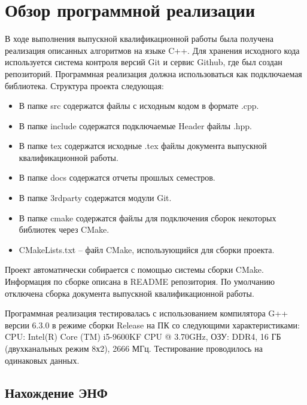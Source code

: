 \newpage

\section{Обзор программной реализации}

В ходе выполнения выпускной квалификационной работы была получена реализация описанных алгоритмов на языке C++. Для хранения исходного кода используется система контроля версий Git и сервис Github, где был создан репозиторий. Программная реализация должна использоваться как подключаемая библиотека. Структура проекта следующая:
\begin{itemize}

\item В папке src содержатся файлы с исходным кодом в формате .cpp.

\item В папке include содержатся подключаемые Header файлы .hpp.

\item В папке tex содержатся исходные .tex файлы документа выпускной квалификационной работы.

\item В папке docs содержатся отчеты прошлых семестров.

\item В папке 3rdparty содержатся модули Git.

\item В папке cmake содержатся файлы для подключения сборок некоторых библиотек через CMake.

\item CMakeLists.txt -- файл CMake, использующийся для сборки проекта.

\end{itemize}

Проект автоматически собирается с помощью системы сборки CMake. Информация по сборке описана в README репозитория. По умолчанию отключена сборка документа выпускной квалификационной работы.

Программная реализация тестировалась с использованием компилятора G++ версии 6.3.0 в режиме сборки Release на ПК со следующими характеристиками: CPU: Intel(R) Core (TM) i5-9600KF CPU @ 3.70GHz, ОЗУ: DDR4, 16 ГБ (двухканальных режим 8х2), 2666 МГц. Тестирование проводилось на одинаковых данных.

\subsection{Нахождение ЭНФ}

